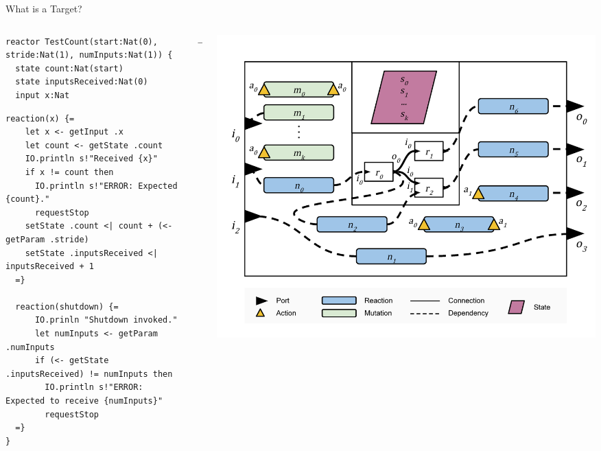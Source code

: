 \documentclass[aspectratio=169]{beamer}
\begin{document}
\begin{frame}[fragile]{What is a Target?}
\begin{columns}[onlytextwidth]

\begin{column}{0.5\textwidth}
\begin{lstlisting}[basicstyle=\tiny]
reactor TestCount(start:Nat(0), stride:Nat(1), numInputs:Nat(1)) {
  state count:Nat(start)
  state inputsReceived:Nat(0)
  input x:Nat
\end{lstlisting}

\vspace{-2mm}

\begin{lstlisting}[basicstyle=\tiny]
  reaction(x) {=
    let x <- getInput .x
    let count <- getState .count
    IO.println s!"Received {x}"  
    if x != count then
      IO.println s!"ERROR: Expected {count}."
      requestStop
    setState .count <| count + (<- getParam .stride)
    setState .inputsReceived <| inputsReceived + 1
  =}

  reaction(shutdown) {=
      IO.prinln "Shutdown invoked."
      let numInputs <- getParam .numInputs 
      if (<- getState .inputsReceived) != numInputs then
        IO.println s!"ERROR: Expected to receive {numInputs}"
        requestStop
  =}
}
\end{lstlisting}
\end{column}

\begin{column}{0.05\textwidth}
\begin{center}
$\rightarrow$
\end{center}
\end{column}

\begin{column}{0.4\textwidth}
\includegraphics[scale=0.18]{reactor-overview}
\end{column}

\end{columns}
\end{frame}
\end{document}

